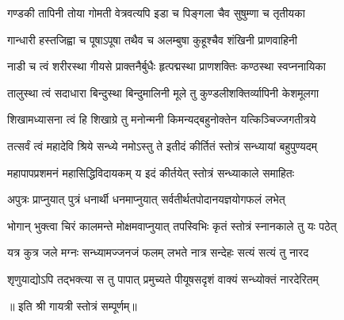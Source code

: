 \twolineshloka
{गण्डकी तापिनी तोया गोमती वेत्रवत्यपि}
{इडा च पिङ्गला चैव सुषुम्णा च तृतीयका}

\twolineshloka
{गान्धारी हस्तजिह्वा च पूषाऽपूषा तथैव च}
{अलम्बुषा कुहूश्चैव शंखिनी प्राणवाहिनी}

\twolineshloka
{नाडी च त्वं शरीरस्था गीयसे प्राक्तनैर्बुधैः}
{हृत्पद्मस्था प्राणशक्तिः कण्ठस्था स्वप्ननायिका}

\twolineshloka
{तालुस्था त्वं सदाधारा बिन्दुस्था बिन्दुमालिनी}
{मूले तु कुण्डलीशक्तिर्व्यापिनी केशमूलगा}

\twolineshloka
{शिखामध्यासना त्वं हि शिखाग्रे तु मनोन्मनी}
{किमन्यद्बहुनोक्तेन यत्किञ्चिज्जगतीत्रये}

\twolineshloka
{तत्सर्वं त्वं महादेवि श्रिये सन्ध्ये नमोऽस्तु ते}
{इतीदं कीर्तितं स्तोत्रं सन्ध्यायां बहुपुण्यदम्}

\twolineshloka
{महापापप्रशमनं महासिद्धिविदायकम्}
{य इदं कीर्तयेत् स्तोत्रं सन्ध्याकाले समाहितः}

\twolineshloka
{अपुत्रः प्राप्नुयात् पुत्रं धनार्थी धनमाप्नुयात्}
{सर्वतीर्थतपोदानयज्ञयोगफलं लभेत्}

\twolineshloka
{भोगान् भुक्त्वा चिरं कालमन्ते मोक्षमवाप्नुयात्}
{तपस्विभिः कृतं स्तोत्रं स्नानकाले तु यः पठेत्}

\twolineshloka
{यत्र कुत्र जले मग्नः सन्ध्यामज्जनजं फलम्}
{लभते नात्र सन्देहः सत्यं सत्यं तु नारद}

\twolineshloka
{शृणुयाद्योऽपि तद्भक्त्या स तु पापात् प्रमुच्यते}
{पीयूषसदृशं वाक्यं सन्ध्योक्तं नारदेरितम्}

॥ इति श्री गायत्री स्तोत्रं सम्पूर्णम्॥